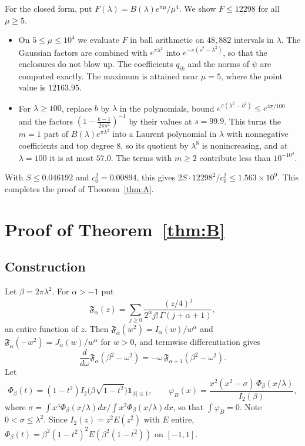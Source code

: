 \documentclass[11pt]{amsart}
\theoremstyle{definition}
\theoremstyle{remark}
\numberwithin{equation}{section}
\newcommand{\F}{\mathfrak{F}}
\begin{document}
For the closed form, put $F(\lambda)=B(\lambda)e^{\pi\mu}/\mu^4$. We show $F\le12298$ for all $\mu\ge5$.
\begin{itemize}
\item On $5\le\mu\le10^4$ we evaluate $F$ in ball arithmetic on $48{,}882$ intervals in $\lambda$. The Gaussian factors are combined with $e^{\pi\lambda^2}$ into $e^{-\pi(s^2-\lambda^2)}$, so that the enclosures do not blow up. The coefficients $q_{ik}$ and the norms of $\psi$ are computed exactly. The maximum is attained near $\mu=5$, where the point value is $12163.95$.
\item For $\lambda\ge100$, replace $b$ by $\lambda$ in the polynomials, bound $e^{\pi(\lambda^2-b^2)}\le e^{4\pi/100}$ and the factors $(1-\frac{k-1}{2\pi s^2})^{-1}$ by their values at $s=99.9$. This turns the $m=1$ part of $B(\lambda)e^{\pi\lambda^2}$ into a Laurent polynomial in $\lambda$ with nonnegative coefficients and top degree $8$, so its quotient by $\lambda^8$ is nonincreasing, and at $\lambda=100$ it is at most $57.0$. The terms with $m\ge2$ contribute less than $10^{-10^4}$.
\end{itemize}
With $S\le0.046192$ and $c_0^2=0.00894$, this gives $2S\cdot12298^2/c_0^2\le1.563\times10^9$. This completes the proof of Theorem~\ref{thm:A}.

\section{Proof of Theorem~\ref{thm:B}}\label{sec:B}

\subsection{Construction}
Let $\beta=2\pi\lambda^2$. For $\alpha>-1$ put
\[
\F_\alpha(z)=\sum_{j\ge0}\frac{(z/4)^j}{2^\alpha j!\,\Gamma(j+\alpha+1)} ,
\]
an entire function of $z$. Then $\F_\alpha(w^2)=I_\alpha(w)/w^\alpha$ and $\F_\alpha(-w^2)=J_\alpha(w)/w^\alpha$ for $w>0$, and termwise differentiation gives
\begin{equation}\label{eq:Fderiv}
\frac{d}{d\omega}\F_\alpha(\beta^2-\omega^2)=-\omega\,\F_{\alpha+1}(\beta^2-\omega^2).
\end{equation}
Let
\[
\Phi_\beta(t)=(1-t^2)I_2\big(\beta\sqrt{1-t^2}\big)\mathbf1_{|t|\le1},\qquad
\varphi_B(x)=\frac{x^2(x^2-\sigma)\,\Phi_\beta(x/\lambda)}{I_2(\beta)},
\]
where $\sigma=\int x^4\Phi_\beta(x/\lambda)dx\big/\int x^2\Phi_\beta(x/\lambda)dx$, so that $\int\varphi_B=0$. Note $0<\sigma\le\lambda^2$. Since $I_2(z)=z^2E(z^2)$ with $E$ entire, $\Phi_\beta(t)=\beta^2(1-t^2)^2E(\beta^2(1-t^2))$ on $[-1,1]$.
\end{document}
